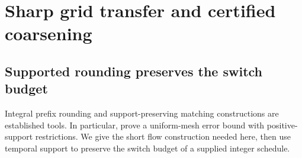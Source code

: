 \section{Sharp grid transfer and certified coarsening}\label{sec:transfer}

\subsection{Supported rounding preserves the switch budget}

Integral prefix rounding and support-preserving matching constructions are
established tools. In particular, \citet[Corollary~2.7]{bestehorn2021vanishing}
prove a uniform-mesh error bound with positive-support restrictions. We give
the short flow construction needed here, then use temporal support to
preserve the switch budget of a supplied integer schedule.

